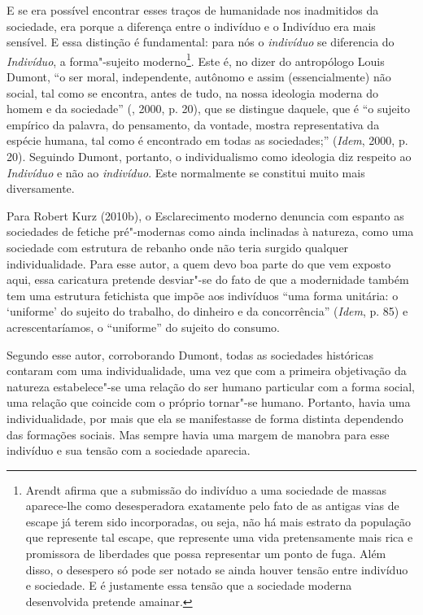 E se era possível encontrar esses traços de humanidade nos inadmitidos
da sociedade, era porque a diferença entre o indivíduo e o Indivíduo era
mais sensível. E essa distinção é fundamental: para nós o
\emph{indivíduo} se diferencia do \emph{Indivíduo}, a forma"-sujeito
moderno\footnote{Arendt afirma que a submissão do indivíduo a uma sociedade
de massas aparece-lhe como desesperadora exatamente pelo fato de as antigas
vias de escape já terem sido incorporadas, ou seja, não há mais estrato da
população que represente tal escape, que represente uma vida pretensamente
mais rica e promissora de liberdades que possa representar um ponto de fuga.
Além disso, o desespero só pode ser notado se ainda houver tensão entre
indivíduo e sociedade. E é justamente essa tensão que a sociedade moderna
desenvolvida pretende amainar.}. Este é, no dizer do antropólogo Louis Dumont, ``o ser moral,
independente, autônomo e assim (essencialmente) não social, tal como se
encontra, antes de tudo, na nossa ideologia moderna do homem e da
sociedade'' (, 2000, p. 20), que se distingue daquele, que é ``o
sujeito empírico da palavra, do pensamento, da vontade, mostra
representativa da espécie humana, tal como é encontrado em todas as
sociedades;'' (\emph{Idem}, 2000, p. 20). Seguindo Dumont, portanto, o
individualismo como ideologia diz respeito ao \emph{Indivíduo} e não ao
\emph{indivíduo}. Este normalmente se constitui muito mais diversamente.

Para Robert Kurz (2010b), o Esclarecimento moderno denuncia com espanto
as sociedades de fetiche pré"-modernas como ainda inclinadas à natureza,
como uma sociedade com estrutura de rebanho onde não teria surgido
qualquer individualidade. Para esse autor, a quem devo boa parte do que
vem exposto aqui, essa caricatura pretende desviar"-se do fato de que a
modernidade também tem uma estrutura fetichista que impõe aos indivíduos
``uma forma unitária: o `uniforme' do sujeito do trabalho, do dinheiro e
da concorrência'' (\emph{Idem}, p. 85) e acrescentaríamos, o
``uniforme'' do sujeito do consumo.

Segundo esse autor, corroborando Dumont, todas as sociedades históricas
contaram com uma individualidade, uma vez que com a primeira objetivação
da natureza estabelece"-se uma relação do ser humano particular com a
forma social, uma relação que coincide com o próprio tornar"-se humano.
Portanto, havia uma individualidade, por mais que ela se manifestasse de
forma distinta dependendo das formações sociais. Mas sempre havia uma
margem de manobra para esse indivíduo e sua tensão com a sociedade
aparecia.

